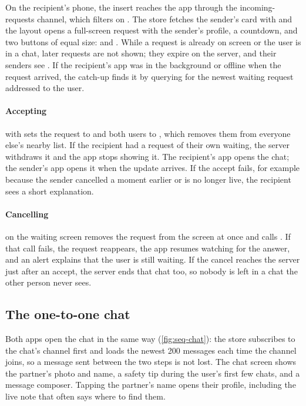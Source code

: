 On the recipient's phone, the insert reaches the app through the incoming-requests channel, which
filters on . The store fetches the sender's card with  and the
 layout opens a full-screen request with the sender's profile, a countdown, and two buttons of
equal size:  and . While a request is already on screen or the user is in a chat,
later requests are not shown; they expire on the server, and their senders see . If the
recipient's app was in the background or offline when the request arrived, the catch-up finds it by
querying for the newest waiting request addressed to the user.

\paragraph{Accepting}  with  sets the request to  and both
users to , which removes them from everyone else's nearby list. If the recipient had a
request of their own waiting, the server withdraws it and the app stops showing it. The recipient's app
opens the chat; the sender's app opens it when the update arrives. If the accept fails, for example
because the sender cancelled a moment earlier or is no longer live, the recipient sees a short
explanation.

\paragraph{Cancelling}  on the waiting screen removes the request from the screen at
once and calls . If that call fails, the request reappears, the app resumes watching
for the answer, and an alert explains that the user is still waiting. If the cancel reaches the server
just after an accept, the server ends that chat too, so nobody is left in a chat the other person never
sees.

\subsection{The one-to-one chat}

Both apps open the chat in the same way (\cref{fig:seq-chat}): the store subscribes to the chat's
channel first and loads the newest 200 messages each time the channel joins, so a message sent between
the two steps is not lost. The chat screen shows the partner's photo and name, a safety tip during the user's first few chats, and
a message composer. Tapping the partner's name opens their profile, including the live note that often
says where to find them.

